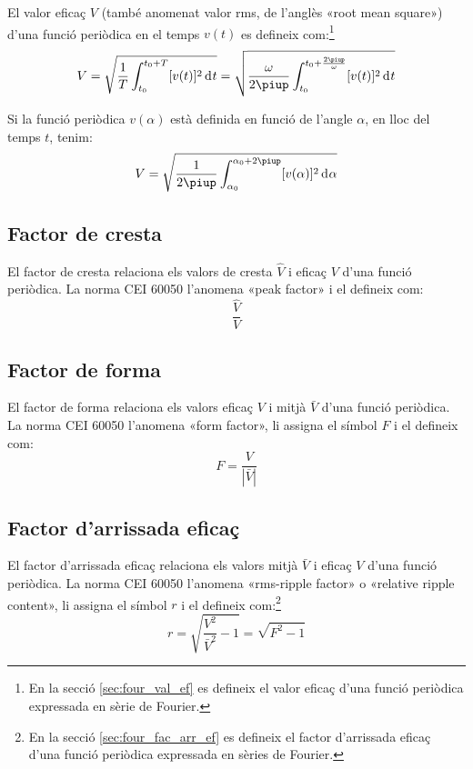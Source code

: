 El valor eficaç  $V$ (també anomenat valor rms, de l'anglès «root
mean square») d'una funció periòdica en el temps $v(t)$ es defineix com:\footnote{En la secció \ref{sec:four_val_ef} es defineix el valor eficaç d'una funció periòdica expressada en sèrie de Fourier.}
\begin{equation}
    V = \sqrt{\frac{1}{T} \int_{t_0}^{t_0+T} [v(t)]^2 \diff
    t} = \sqrt{\frac{\omega}{2\piup} \int_{t_0}^{t_0+\frac{2\piup}{\omega}}
     [v(t)]^2 \diff t}
\end{equation}

Si la funció periòdica $v(\alpha)$ està definida en funció de
l'angle $\alpha$, en lloc del temps $t$, tenim:
\begin{equation}
    V = \sqrt{\frac{1}{2\piup} \int_{\alpha_0}^{\alpha_0+2\piup}
     [v(\alpha)]^2 \diff \alpha}
\end{equation}

\subsection{Factor de cresta}

El factor de cresta relaciona els valors de cresta $\hat{V}$
  i eficaç $V$ d'una funció periòdica. La norma CEI 60050 l'anomena «peak factor» i el defineix com:
\begin{equation}
     \frac{\hat{V}}{V}
\end{equation}

\subsection{Factor de forma}

El factor de forma relaciona els valors eficaç $V$
i mitjà $\bar{V}$ d'una funció periòdica. La norma CEI 60050 l'anomena «form factor», li assigna el símbol $F$ i el defineix com:
\begin{equation}
    F = \frac{V}{|\bar{V}|}
\end{equation}

\subsection{Factor d'arrissada eficaç}

El factor d'arrissada eficaç relaciona els
valors mitjà $\bar{V}$ i eficaç $V$ d'una funció periòdica.
La norma CEI 60050 l'anomena «rms-ripple factor» o «relative ripple content», li assigna el símbol $r$ i el defineix com:\footnote{En la secció \ref{sec:four_fac_arr_ef} es defineix el factor d'arrissada eficaç d'una funció periòdica expressada en sèries de Fourier.}
\begin{equation}
    r = \sqrt{\frac{V^2}{\bar{V}^2}-1} = \sqrt{F^2-1}\label{eq:rms_rip}
\end{equation}

